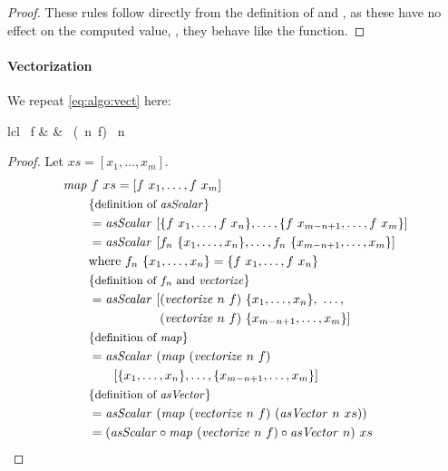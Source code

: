 \begin{proof}[Proof]
  These rules follow directly from the definition of \toGlobal and \toLocal, as these have no effect on the computed value, \ie, they behave like the \id function.
\end{proof}


\paragraph{Vectorization}

We repeat \autoref{eq:algo:vect} here:
\begin{rerule*}{lcl}
  \map\ f
    & \rightarrow &
      \asScalar
        \circ \map\ (\vect\ n\ f)
        \circ \asVector\ n
\end{rerule*}


\begin{proof}[Proof]
  Let $xs = [x_1, \ldots, x_m]$.
  \begin{align*}
    &\map\ f\ xs = [f\ x_1, \ldots, f\ x_m]\\
    &\qquad \comment{definition of \asScalar}\\
    &\qquad = \asScalar\ [\{f\ x_1, \ldots, f\ x_n\}, \ldots ,\{f\ x_{m-n+1}, \ldots, f\ x_m\}]\\
    &\qquad = \asScalar\ [f_n\ \{x_1, \ldots, x_n\}, \ldots ,f_n\ \{x_{m-n+1}, \ldots, x_m\}]\\
    &\qquad \text{where } f_n\ \{x_1, \ldots, x_n\} = \{f\ x_1, \ldots, f\ x_n\}\\
    &\qquad \comment{definition of $f_n$ and \vect}\\
    &\qquad = \asScalar\
      \begin{aligned}[t]
        [&(\vect\ n\ f)\ \{x_1, \ldots, x_n\},\ \ldots ,\\
         &(\vect\ n\ f)\ \{x_{m-n+1}, \ldots, x_m\}]
      \end{aligned}\\
    &\qquad \comment{definition of \map}\\
    &\qquad = \asScalar\ (\map\ (\vect\ n\ f)\\
    &\qquad\qquad [\{x_1, \ldots, x_n\}, \ldots ,\{x_{m-n+1}, \ldots, x_m\}]\\
    &\qquad \comment{definition of \asVector}\\
    &\qquad = \asScalar\ (\map\ (\vect\ n\ f)\ (\asVector\ n\ xs))\\
    &\qquad = (\asScalar \circ \map\ (\vect\ n\ f) \circ \asVector\ n)\ xs
  \end{align*}
\end{proof}














